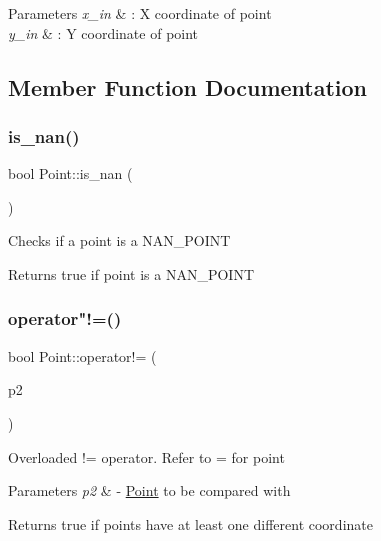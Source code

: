 \begin{DoxyParams}{Parameters}
{\em x\+\_\+in} & \+: X coordinate of point \\
\hline
{\em y\+\_\+in} & \+: Y coordinate of point \\
\hline
\end{DoxyParams}


\subsection{Member Function Documentation}
\mbox{\label{classPoint_a2bc8aed929f6be2b543ba2f26b8a5f72}} 
\subsubsection{\texorpdfstring{is\+\_\+nan()}{is\_nan()}}
{\footnotesize\ttfamily bool Point\+::is\+\_\+nan (\begin{DoxyParamCaption}{ }\end{DoxyParamCaption})}

Checks if a point is a N\+A\+N\+\_\+\+P\+O\+I\+NT \begin{DoxyReturn}{Returns}
true if point is a N\+A\+N\+\_\+\+P\+O\+I\+NT 
\end{DoxyReturn}
\mbox{\label{classPoint_ade5f3908ec0e412aea8c3e12f5d0e26f}} 
\subsubsection{\texorpdfstring{operator"!=()}{operator!=()}}
{\footnotesize\ttfamily bool Point\+::operator!= (\begin{DoxyParamCaption}\item[{const \hyperlink{classPoint}{Point} \&}]{p2 }\end{DoxyParamCaption})}

Overloaded != operator. Refer to = for point 
\begin{DoxyParams}{Parameters}
{\em p2} & -\/ \hyperlink{classPoint}{Point} to be compared with \\
\hline
\end{DoxyParams}
\begin{DoxyReturn}{Returns}
true if points have at least one different coordinate 
\end{DoxyReturn}
\mbox{\label{classPoint_a2d285a505e84d64a96974d5247e8ae7a}} 
